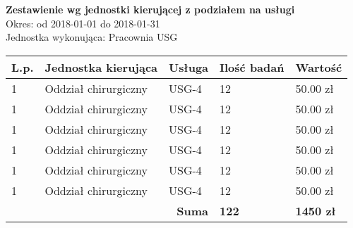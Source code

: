 \documentclass[a4paper,10pt]{article}
\begin{document}
	\noindent
	\textbf{\LARGE{Zestawienie wg jednostki kierującej z podziałem na usługi}}\\
	
	\noindent
	Okres: od 2018-01-01 do 2018-01-31\\	
	Jednostka wykonująca: Pracownia USG\\
	
	
	\begin{longtable}[l]{| l | l | l | l| l |}	
		\hline
		\textbf{L.p.} & \textbf{Jednostka kierująca} & \textbf{Usługa} & \textbf{Ilość badań} & \textbf{Wartość} \\ \hline
		\endhead
		1 & Oddział chirurgiczny & USG-4 & 12 & 50.00 zł \\ \hline
		1 & Oddział chirurgiczny & USG-4 & 12 & 50.00 zł \\ \hline
				1 & Oddział chirurgiczny & USG-4 & 12 & 50.00 zł \\ \hline
						1 & Oddział chirurgiczny & USG-4 & 12 & 50.00 zł \\ \hline
								1 & Oddział chirurgiczny & USG-4 & 12 & 50.00 zł \\ \hline
										1 & Oddział chirurgiczny & USG-4 & 12 & 50.00 zł \\ \hline
		\multicolumn{3}{|r|}{\textbf{Suma}} & \textbf{122} & \textbf{1450 zł} \\ \hline
	\end{longtable}
	
\end{document}
